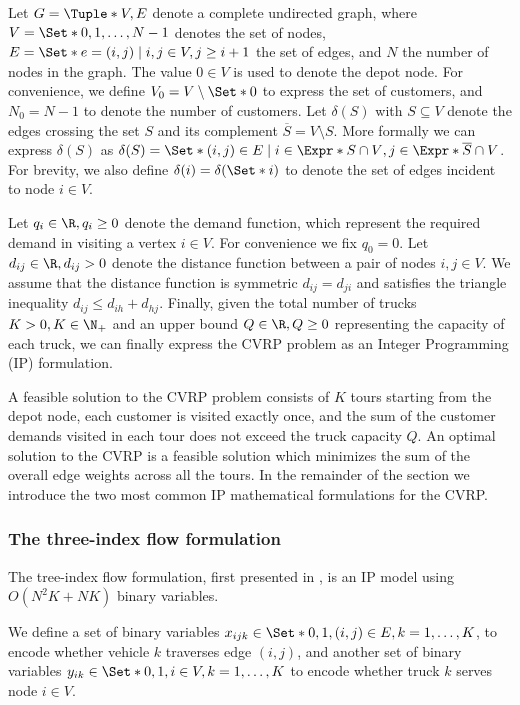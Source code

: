 \medskip

Let $G = \Tuple*{V, E}$ denote a complete undirected graph, where $V = \Set*{0, 1, \dots, N - 1}$ denotes the set of nodes,
$E = \Set*{e = (i, j) \mid \allowbreak i,j \in V, \allowbreak  j \ge i + 1}$ the set of edges, and $N$ the number of nodes in the graph.
The value $0 \in V$ is used to denote the depot node.
For convenience, we define $V_0 = V \setminus \Set*{0}$ to express the set of customers, and $N_0 = N - 1$ to denote the number of customers.
Let $\delta(S)$ with $S \subseteq V$ denote the edges crossing the set $S$ and its complement $\overline{S} = V \setminus S$.
More formally we can express $\delta(S)$ as $\delta(S) = \Set*{ (i, j) \in E \mid i \in \Expr*{S \cap V}, j \in \Expr*{ \overline{S} \cap V } }$.
For brevity, we also define $\delta(i) = \delta(\Set*{i})$ to denote the set of edges incident to node $i \in V$.

Let $q_{i} \in \R, q_{i} \ge 0$ denote the demand function, which represent the required demand in visiting a vertex $i \in V$.
For convenience we fix $q_0 = 0$.
Let $d_{ij} \in \R, d_{ij} > 0$ denote the distance function between a pair of nodes  $i, j \in V$.
We assume that the distance function is symmetric $d_{ij} = d_{ji}$ and satisfies the triangle inequality $d_{ij} \le d_{ih} + d_{hj}$.
Finally, given the total number of trucks $K > 0, K \in \N_+$ and an upper bound $Q \in \R,Q \ge 0$ representing the capacity of each truck, we can finally express the CVRP problem as an Integer Programming (IP) formulation.

A feasible solution to the CVRP problem consists of $K$ tours starting from the depot node, each customer is visited exactly once, and the sum of the customer demands visited in each tour does not exceed the truck capacity $Q$.
An optimal solution to the CVRP is a feasible solution which minimizes the sum of the overall edge weights across all the tours.
In the remainder of the section we introduce the two most common IP mathematical formulations for the CVRP.

\subsubsection{The three-index flow formulation}
The tree-index flow formulation, first presented in \textcite{toth_vehicle_2002}, is an IP model using $O(N^2 K + N K)$ binary variables.

We define a set of binary variables $x_{ijk} \in \Set*{0, 1}, (i, j) \in E, k = 1, \dots, K$, to encode whether vehicle $k$ traverses edge $(i, j)$,
and another set of binary variables $y_{ik} \in \Set*{0, 1}, i \in V, k = 1, \dots, K$ to encode whether truck $k$ serves node $i \in V$.

